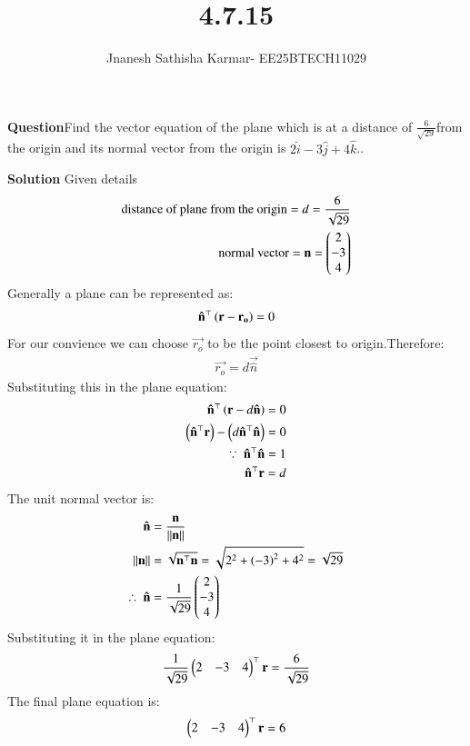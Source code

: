 \documentclass[journal]{IEEEtran}
\theoremstyle{remark}
\begin{document}
\setlength{\abovedisplayskip}{0pt}
\setlength{\belowdisplayskip}{0pt}
\setlength{\abovedisplayshortskip}{0pt}
\setlength{\belowdisplayshortskip}{0pt}

\onecolumn

\title{4.7.15}
\author{Jnanesh Sathisha Karmar- EE25BTECH11029}
\maketitle


\renewcommand{\thefigure}{\theenumi}
\renewcommand{\thetable}{\theenumi}
\textbf{Question}Find the vector equation of the plane which is at a distance of $\frac{6}{\sqrt{29}}$from the origin and its normal vector from the origin is $2\hat{i}-3\hat{j}+4\hat{k}$..

\textbf{Solution} Given details
\begin{align}
   \text{distance of plane from the origin}=d=\frac{6}{\sqrt
   {29}}\\
   \text{normal vector}=\mathbf{n}=\begin{pmatrix}2\\-3\\4\end{pmatrix}
\end{align}
Generally a plane can be represented as:
\begin{align}
    \mathbf{\hat{n}}^{\top}\left(\mathbf{r}-\mathbf{r_o}\right)=0
\end{align}
For our convience we can choose $\vec{r_o}$ to be the point closest to origin.Therefore:
\begin{align}
   \vec{r_o}=d\vec{\hat{n}}
\end{align}
Substituting this in the plane equation:
\begin{align}
    \mathbf{\hat{n}}^{\top}\left(\mathbf{r}-d\mathbf{\hat{n}}\right)=0\\
    \left(\mathbf{\hat{n}}^{\top}\mathbf{r}\right)-\left(d\mathbf{\hat{n}}^{\top}\mathbf{\hat{n}}\right)=0\\
    \because\ \mathbf{\hat{n}}^{\top}\mathbf{\hat{n}}=1\\
    \mathbf{\hat{n}}^{\top}\mathbf{r}=d
\end{align}
The unit normal vector is:
\begin{align}
    \mathbf{\hat{n}}&=\frac{\mathbf{n}}{\left\lVert\mathbf{n}\right\rVert}\\
    \left\lVert\mathbf{n}\right\rVert&=\sqrt{\mathbf{n}^{\top}\mathbf{n}}=
    \sqrt{2^2+\left(-3\right)^2+4^2}=\sqrt{29}
   \\ \therefore\ \mathbf{\hat{n}}&=\frac{1}{\sqrt{29}}\begin{pmatrix}2\\-3\\4\end{pmatrix}
\end{align}
Substituting it in the plane equation:
\begin{align}
    \frac{1}{\sqrt{29}}\begin{pmatrix}2 & -3 & 4\end{pmatrix}^{\top}\mathbf{r}=\frac{6}{\sqrt{29}}
\end{align}
The final plane equation is:
\begin{align}
    \begin{pmatrix}2 & -3 & 4\end{pmatrix}^{\top}\mathbf{r}=6
\end{align}
\end{document}
